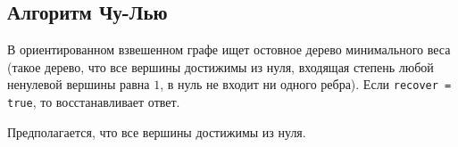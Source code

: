 \subsection{Алгоритм Чу-Лью}
В ориентированном взвешенном графе ищет остовное дерево минимального веса (такое дерево, что все вершины достижимы из нуля, входящая степень любой ненулевой вершины равна $1$, в нуль не входит ни одного ребра).
Если \texttt{recover = true}, то восстанавливает ответ.

Предполагается, что все вершины достижимы из нуля.

